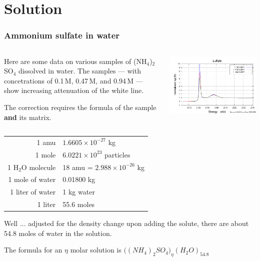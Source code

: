 \documentclass[10pt, xcolor=x11names, compress, handout]{beamer}
\begin{document}
\section{Solution}
\begin{frame}
  \frametitle{Ammonium sulfate in water}
    \small
  
  \begin{columns}
    \begin{column}{0.5\linewidth}
      Here are some data on various samples of (NH$_4$)$_2$SO$_4$
      dissolved in water.  The samples --- with concetrations of
      0.1\,M, 0.47\,M, and 0.94\,M --- show increasing attenuation of
      the white line.

      \smallskip

      The correction requires the formula of the sample \textbf{and}
      its matrix.
    \end{column}
    \begin{column}{0.5\linewidth}
      \includegraphics[width=\linewidth]{images/sulfate.png}
    \end{column}
  \end{columns}
  \begin{center}
    \begin{tabular}{r@{~=~}l}
      1 amu & $1.6605\times10^{-27}$ kg \\
      1 mole & $6.0221\times10^{23}$ particles \\
      1 H$_2$O molecule & 18 amu  = $2.988 \times 10^{-26}$ kg \\
      1 mole of water & 0.01800 kg \\
      1 liter of water & 1 kg water \\
      1 liter &  55.6 moles
    \end{tabular}
  \end{center}

  Well ... adjusted for the density change upon adding the solute,
  there are about 54.8 moles of water in the solution.

  \medskip

  The formula for an $\eta$ molar solution is
  \alert{$\big((NH_4)_2SO_4\big)_\eta(H_2O)_{54.8}$}
\end{frame}
\end{document}
